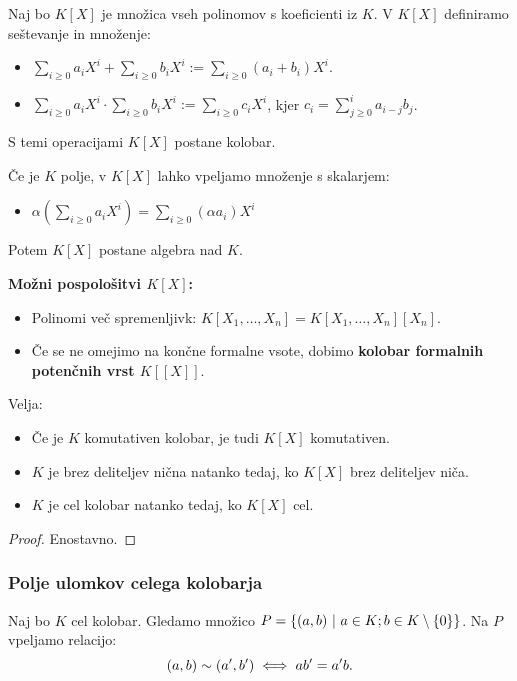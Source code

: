 Naj bo $K[X]$ je množica vseh polinomov s koeficienti iz $K$. V $K[X]$ definiramo seštevanje in množenje:
\begin{itemize}
    \item $\sum_{i \geq 0} a_iX^i + \sum_{i \geq 0} b_iX^i := \sum_{i \geq 0} (a_i + b_i)X^i$.
    \item $\sum_{i \geq 0} a_iX^i \cdot \sum_{i \geq 0} b_iX^i := \sum_{i \geq 0} c_iX^i$, kjer $c_i = \sum_{j \geq 0}^{i} a_{i - j} b_j$.
\end{itemize}
S temi operacijami $K[X]$ postane kolobar.
\begin{opomba}
    Če je $K$ polje, v $K[X]$ lahko vpeljamo množenje s skalarjem:
    \begin{itemize}
        \item $\alpha (\sum_{i \geq 0} a_iX^i) = \sum_{i \geq 0} (\alpha a_i)X^i$
    \end{itemize} 
    Potem $K[X]$ postane algebra nad $K$.
\end{opomba}
\textbf{Možni pospološitvi $K[X]$:}
\begin{itemize}
    \item Polinomi več spremenljivk: $K[X_1, \ldots, X_n] = K[X_1, \ldots, X_n][X_n]$.
    \item Če se ne omejimo na končne formalne vsote, dobimo \textbf{kolobar formalnih potenčnih vrst $K[[X]]$}.
\end{itemize}     

\begin{trditev}
    Velja:
    \begin{itemize}
        \item Če je $K$ komutativen kolobar, je tudi $K[X]$ komutativen.
        \item $K$ je brez deliteljev nična natanko tedaj, ko $K[X]$ brez deliteljev niča.
        \item $K$ je cel kolobar natanko tedaj, ko $K[X]$ cel.
    \end{itemize}
\end{trditev}

\begin{proof}
    Enostavno.
\end{proof}

\subsubsection*{Polje ulomkov celega kolobarja}    
Naj bo $K$ cel kolobar. Gledamo množico $P = \left\{(a,b) \ | \ a \in K; b \in K \setminus \left\{0\right\}\right\}$. Na $P$ vpeljamo relacijo:
$$(a, b) \sim (a', b') \iff ab' = a'b.$$

